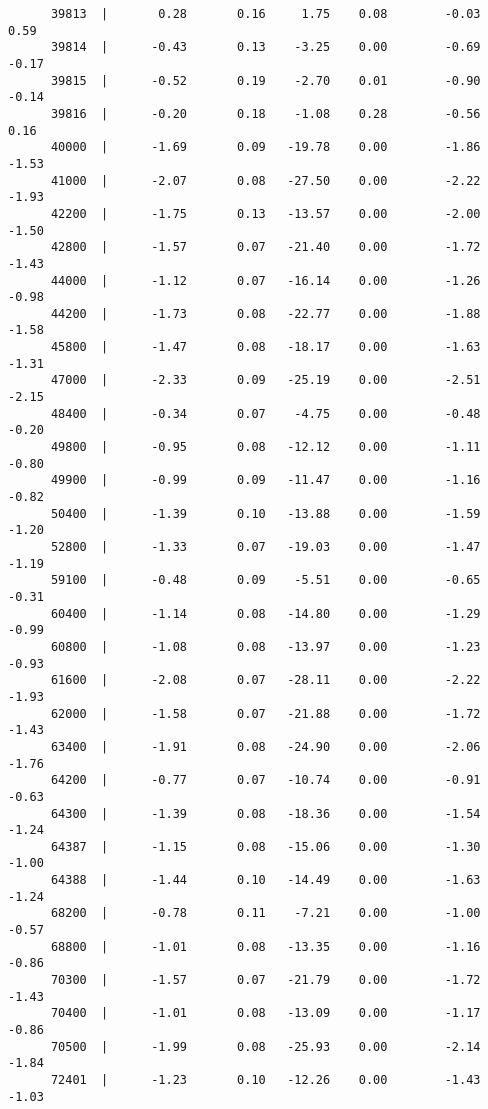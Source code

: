 \documentclass[10pt, letterpaper]{article}
\begin{document}
\begin{spacing}{1.4}
\begin{spacing}{.5}
\begin{scriptsize}
\begin{verbatim}
      39813  |       0.28       0.16     1.75    0.08        -0.03        0.59
      39814  |      -0.43       0.13    -3.25    0.00        -0.69       -0.17
      39815  |      -0.52       0.19    -2.70    0.01        -0.90       -0.14
      39816  |      -0.20       0.18    -1.08    0.28        -0.56        0.16
      40000  |      -1.69       0.09   -19.78    0.00        -1.86       -1.53
      41000  |      -2.07       0.08   -27.50    0.00        -2.22       -1.93
      42200  |      -1.75       0.13   -13.57    0.00        -2.00       -1.50
      42800  |      -1.57       0.07   -21.40    0.00        -1.72       -1.43
      44000  |      -1.12       0.07   -16.14    0.00        -1.26       -0.98
      44200  |      -1.73       0.08   -22.77    0.00        -1.88       -1.58
      45800  |      -1.47       0.08   -18.17    0.00        -1.63       -1.31
      47000  |      -2.33       0.09   -25.19    0.00        -2.51       -2.15
      48400  |      -0.34       0.07    -4.75    0.00        -0.48       -0.20
      49800  |      -0.95       0.08   -12.12    0.00        -1.11       -0.80
      49900  |      -0.99       0.09   -11.47    0.00        -1.16       -0.82
      50400  |      -1.39       0.10   -13.88    0.00        -1.59       -1.20
      52800  |      -1.33       0.07   -19.03    0.00        -1.47       -1.19
      59100  |      -0.48       0.09    -5.51    0.00        -0.65       -0.31
      60400  |      -1.14       0.08   -14.80    0.00        -1.29       -0.99
      60800  |      -1.08       0.08   -13.97    0.00        -1.23       -0.93
      61600  |      -2.08       0.07   -28.11    0.00        -2.22       -1.93
      62000  |      -1.58       0.07   -21.88    0.00        -1.72       -1.43
      63400  |      -1.91       0.08   -24.90    0.00        -2.06       -1.76
      64200  |      -0.77       0.07   -10.74    0.00        -0.91       -0.63
      64300  |      -1.39       0.08   -18.36    0.00        -1.54       -1.24
      64387  |      -1.15       0.08   -15.06    0.00        -1.30       -1.00
      64388  |      -1.44       0.10   -14.49    0.00        -1.63       -1.24
      68200  |      -0.78       0.11    -7.21    0.00        -1.00       -0.57
      68800  |      -1.01       0.08   -13.35    0.00        -1.16       -0.86
      70300  |      -1.57       0.07   -21.79    0.00        -1.72       -1.43
      70400  |      -1.01       0.08   -13.09    0.00        -1.17       -0.86
      70500  |      -1.99       0.08   -25.93    0.00        -2.14       -1.84
      72401  |      -1.23       0.10   -12.26    0.00        -1.43       -1.03

\end{verbatim}
\end{scriptsize}
\end{spacing}
\end{spacing}
\end{document}
